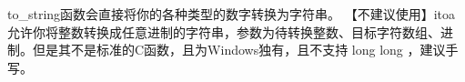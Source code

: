 to\_string函数会直接将你的各种类型的数字转换为字符串。
【不建议使用】itoa允许你将整数转换成任意进制的字符串，参数为待转换整数、目标字符数组、进制。但是其不是标准的C函数，且为Windows独有，且不支持 long long ，建议手写。